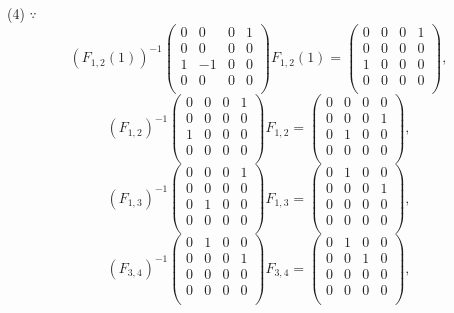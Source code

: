 \documentclass[color=black,device=normal,lang=cn,mode=geye]{elegantnote}
\begin{document}
\begin{solution}
    (4) $\because$
    \[(F_{1,2}(1))^{-1}\begin{pmatrix}
        0 & 0 & 0 & 1 \\
        0 & 0 & 0 & 0 \\
        1 & -1 & 0 & 0 \\
        0 & 0 & 0 & 0 \\
    \end{pmatrix}F_{1,2}(1)=\begin{pmatrix}
        0 & 0 & 0 & 1 \\
        0 & 0 & 0 & 0 \\
        1 & 0 & 0 & 0 \\
        0 & 0 & 0 & 0 \\
    \end{pmatrix},\]
    \[(F_{1,2})^{-1}\begin{pmatrix}
        0 & 0 & 0 & 1 \\
        0 & 0 & 0 & 0 \\
        1 & 0 & 0 & 0 \\
        0 & 0 & 0 & 0 \\
    \end{pmatrix}F_{1,2}=\begin{pmatrix}
        0 & 0 & 0 & 0 \\
        0 & 0 & 0 & 1 \\
        0 & 1 & 0 & 0 \\
        0 & 0 & 0 & 0 \\
    \end{pmatrix},\]
    \[(F_{1,3})^{-1}\begin{pmatrix}
        0 & 0 & 0 & 1 \\
        0 & 0 & 0 & 0 \\
        0 & 1 & 0 & 0 \\
        0 & 0 & 0 & 0 \\
    \end{pmatrix}F_{1,3}=\begin{pmatrix}
        0 & 1 & 0 & 0 \\
        0 & 0 & 0 & 1 \\
        0 & 0 & 0 & 0 \\
        0 & 0 & 0 & 0 \\
    \end{pmatrix},\]
    \[(F_{3,4})^{-1}\begin{pmatrix}
        0 & 1 & 0 & 0 \\
        0 & 0 & 0 & 1 \\
        0 & 0 & 0 & 0 \\
        0 & 0 & 0 & 0 \\
    \end{pmatrix}F_{3,4}=\begin{pmatrix}
        0 & 1 & 0 & 0 \\
        0 & 0 & 1 & 0 \\
        0 & 0 & 0 & 0 \\
        0 & 0 & 0 & 0 \\
    \end{pmatrix},\]


\end{solution}
\end{document}
